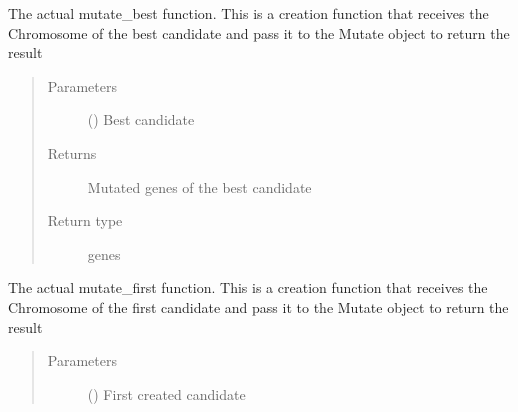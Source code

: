 \documentclass[letterpaper,10pt,english]{sphinxmanual}
\begin{document}
\begin{fulllineitems}
\begin{fulllineitems}
\label{\detokenize{MolOpt.genetic:MolOpt.genetic.genetic.Genetic.mutate_best}}
\sphinxAtStartPar
The actual mutate\_best function. This is a creation function that receives the Chromosome of the best 
candidate and pass it to the Mutate object to return the result
\begin{quote}\begin{description}
\item[{Parameters}] \leavevmode
\sphinxAtStartPar
{} ({\hyperref[\detokenize{MolOpt.genetic:MolOpt.genetic.genetic.Chromosome}]{}}) \textendash{} Best candidate

\item[{Returns}] \leavevmode
\sphinxAtStartPar
Mutated genes of the best candidate

\item[{Return type}] \leavevmode
\sphinxAtStartPar
genes

\end{description}\end{quote}

\end{fulllineitems}


\begin{fulllineitems}
\label{\detokenize{MolOpt.genetic:MolOpt.genetic.genetic.Genetic.mutate_first}}
\sphinxAtStartPar
The actual mutate\_first function. This is a creation function that receives the Chromosome of the first 
candidate and pass it to the Mutate object to return the result
\begin{quote}\begin{description}
\item[{Parameters}] \leavevmode
\sphinxAtStartPar
{} ({\hyperref[\detokenize{MolOpt.genetic:MolOpt.genetic.genetic.Chromosome}]{}}) \textendash{} First created candidate


\end{description}
\end{quote}
\end{fulllineitems}
\end{fulllineitems}
\end{document}
